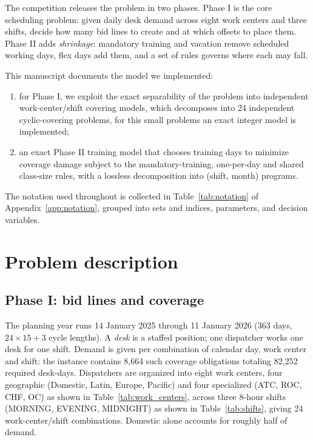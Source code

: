 \documentclass[preprint,12pt]{elsarticle}
\begin{document}
The competition releases the problem in two phases. Phase I is the core scheduling problem: given daily desk demand across eight work centers and three shifts, decide how many bid lines to create and at which offsets to place them. Phase II adds \emph{shrinkage}: mandatory training and vacation remove scheduled working days, flex days add them, and a set of rules governs where each may fall.

This manuscript documents the model we implemented:
\begin{enumerate}
   \item for Phase I, we exploit the exact separability of the problem into independent work-center/shift covering models, which decomposes into 24 independent cyclic-covering problems, for this small problems an exact integer model is implemented;
   \item an exact Phase II training model that chooses training days to minimize coverage damage subject to the mandatory-training, one-per-day and shared class-size rules, with a lossless decomposition into (shift, month) programs.
\end{enumerate}

The notation used throughout is collected in Table~\ref{tab:notation} of Appendix~\ref{app:notation}, grouped into sets and indices, parameters, and decision variables.

\section{Problem description}
   \subsection{Phase I: bid lines and coverage}
      The planning year runs 14 January 2025 through 11 January 2026 (363 days, $24\times15+3$ cycle lengths). A \emph{desk} is a staffed position; one dispatcher works one desk for one shift. Demand is given per combination of calendar day, work center and shift: the instance contains 8,664 such coverage obligations totaling 82,252 required desk-days. Dispatchers are organized into eight work centers, four geographic (Domestic, Latin, Europe, Pacific) and four specialized (ATC, ROC, CHF, OC) as shown in Table~\ref{tab:work_centers}, across three 8-hour shifts (MORNING, EVENING, MIDNIGHT) as shown in Table~\ref{tab:shifts}, giving 24 work-center/shift combinations. Domestic alone accounts for roughly half of demand.
\end{document}
